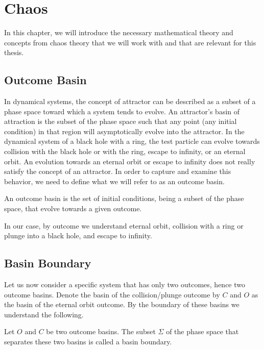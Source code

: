 \chapter{Chaos}
\label{chap:chaos}

In this chapter, we will introduce the necessary mathematical theory and concepts from chaos theory that we will work with and that are relevant for this thesis.

\section{Outcome Basin}
In dynamical systems, the concept of attractor can be described as a subset of a phase space toward which a system tends to evolve. An attractor's basin of attraction is the subset of the phase space such that any point (any initial condition) in that region will asymptotically evolve into the attractor. In the dynamical system of a black hole with a ring,
the test particle can evolve towards collision with the black hole or with the ring, escape to infinity, or an eternal orbit. An evolution towards an eternal orbit or escape to infinity does not really satisfy the concept of an attractor. In order to capture and examine this behavior, we need to define what we will refer to as an outcome basin. 

\begin{defn}
An outcome basin is the set of initial conditions, being a subset of the phase space, that evolve towards a given outcome.
\end{defn}

In our case, by outcome we understand eternal orbit, collision with a ring or plunge into a black hole, and escape to infinity.

\section{Basin Boundary}
Let us now consider a specific system that has only two outcomes, hence two outcome basins. Denote the basin of the collision/plunge outcome by $C$ and $O$ as the basin of the eternal orbit outcome. By the boundary of these basins we understand the following.

\begin{defn}
Let \(O\) and \(C\) be two outcome basins. The subset \(\Sigma\) of the phase space that separates these two basins is called a basin boundary.
\end{defn}

